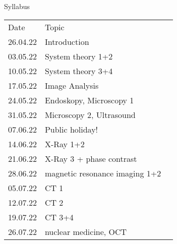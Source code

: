 \begin{frame}[c]{Syllabus}
\begin{table}[]
\begin{tabular}{rll}
\multicolumn{1}{l}{Date} & \multicolumn{1}{l}{Topic}      & \multicolumn{1}{c}{} \\
26.04.22                 & Introduction                   &                      \\
03.05.22                 & System theory 1+2              &                      \\
10.05.22                 & System theory  3+4             &                      \\
17.05.22                 & Image Analysis                 &                      \\
24.05.22                 & Endoskopy, Microscopy 1       &                      \\
31.05.22                 & Microscopy 2, Ultrasound       &                      \\
07.06.22                 & Public holiday!                &                      \\
14.06.22                 & X-Ray 1+2                      &                      \\
21.06.22                 & X-Ray 3 + phase contrast       &                      \\
28.06.22                 & magnetic resonance imaging 1+2 &                      \\
05.07.22                 & CT 1                           &                      \\
12.07.22                 & CT 2                           &                      \\
19.07.22                 & CT 3+4                         &                      \\
26.07.22                 & nuclear medicine, OCT          &                     
\end{tabular}
\end{table}
\end{frame}

